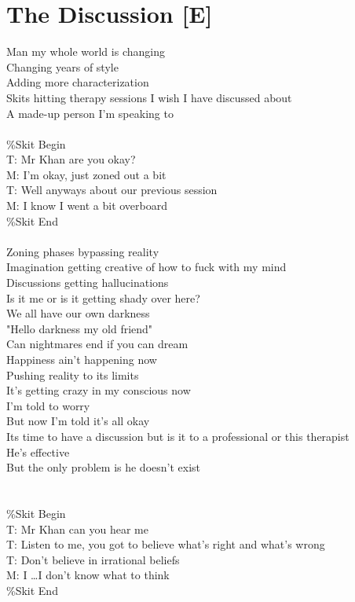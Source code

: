 \documentclass[12pt, b5paper, oneside]{book}
\begin{document}
\section{The Discussion [E]}
Man my whole world is changing
\\Changing years of style
\\Adding more characterization
\\Skits hitting therapy sessions I wish I have discussed about
\\A made-up person I'm speaking to
%
\\\\\%Skit Begin
\\T: Mr Khan are you okay?
\\M: I'm okay, just zoned out a bit
\\T: Well anyways about our previous session
\\M: I know I went a bit overboard
\\\%Skit End
%
\\\\Zoning phases bypassing reality
\\Imagination getting creative of how to fuck with my mind
\\Discussions getting hallucinations
\\Is it me or is it getting shady over here?
\\We all have our own darkness
\\"Hello darkness my old friend"
\\Can nightmares end if you can dream
\\Happiness ain't happening now
\\Pushing reality to its limits
\\It's getting crazy in my conscious now
\\I'm told to worry
\\But now I'm told it's all okay
\\Its time to have a discussion but is it to a professional or this therapist
\\He's effective
\\But the only problem is he doesn't exist
%
\\\\\\\%Skit Begin
\\T: Mr Khan can you hear me
\\T: Listen to me, you got to believe what's right and what's wrong
\\T: Don't believe in irrational beliefs
\\M: I \dots I don't know what to think
\\\%Skit End 
\newpage
\end{document}
